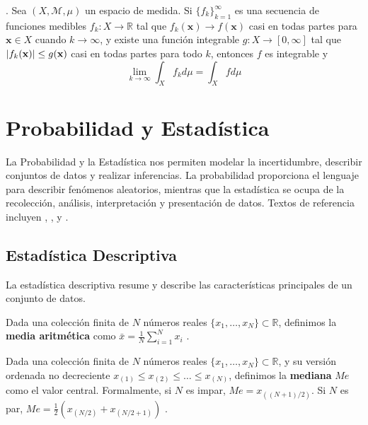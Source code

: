 \begin{theorem}
\label{thm:lebesgue_dct}
\citep[Thm. 1.34]{Rudin1987}. Sea $(X, \mathcal{M}, \mu)$ un espacio de medida. Si $\{f_k\}_{k=1}^\infty$ es una secuencia de funciones medibles $f_k: X \to \mathbb{R}$ tal que $f_k(\mathbf{x}) \to f(\mathbf{x})$ casi en todas partes para $\mathbf{x} \in X$ cuando $k \to \infty$, y existe una función integrable $g: X \to [0, \infty]$ tal que $\left\lvert f_k(\mathbf{x})\right\rvert \le g(\mathbf{x})$ casi en todas partes para todo $k$, entonces $f$ es integrable y
\[ \lim_{k \to \infty} \int_X f_k d\mu = \int_X f d\mu \]
\end{theorem}


\section{Probabilidad y Estadística}
\label{sec:probability_statistics}

La Probabilidad y la Estadística nos permiten modelar la incertidumbre, describir conjuntos de datos y realizar inferencias. La probabilidad proporciona el lenguaje para describir fenómenos aleatorios, mientras que la estadística se ocupa de la recolección, análisis, interpretación y presentación de datos. Textos de referencia incluyen \citet{CasellaBerger2002}, \citet{Ross2014}, \citet{DeGrootSchervish2012} y \citet{rohatgi_introduction_nodate}.

\subsection{Estadística Descriptiva}
\label{subsec:descriptive_statistics_general}

La estadística descriptiva resume y describe las características principales de un conjunto de datos.

\begin{definition}
\label{def:mean_general}
Dada una colección finita de $N$ números reales $\{x_1, \dots, x_N\} \subset \mathbb{R}$, definimos la \textbf{media aritmética} como $\bar{x} = \frac{1}{N} \sum_{i=1}^N x_i$ \citep{CasellaBerger2002}.
\end{definition}

\begin{definition}[Mediana]
\label{def:median_general}
Dada una colección finita de $N$ números reales $\{x_1, \dots, x_N\} \subset \mathbb{R}$, y su versión ordenada no decreciente $x_{(1)} \leq x_{(2)} \leq \dots \leq x_{(N)}$, definimos la \textbf{mediana} $Me$ como el valor central. Formalmente, si $N$ es impar, $Me = x_{((N+1)/2)}$. Si $N$ es par, $Me = \frac{1}{2}(x_{(N/2)} + x_{(N/2+1)})$ \citep{DeGrootSchervish2012}.
\end{definition}

